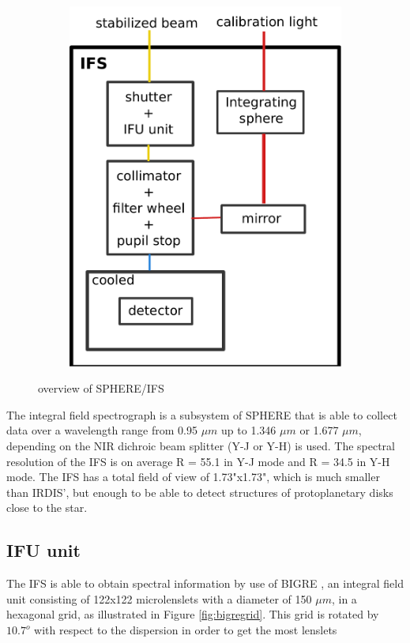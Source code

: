 \documentclass[twoside,single]{lion-msc}
\begin{document}
\begin{figure}[hb]
\begin{subfigure}{.30\textwidth}
  \includegraphics[trim={0cm 0cm 0cm 0cm},clip,width=1\linewidth]{overview}
  \caption{}
\end{subfigure}
\caption{overview of SPHERE/IFS}
\label{fig:overviewIFS}
\end{figure}

The integral field spectrograph is a subsystem of SPHERE that is able to collect data over a wavelength range from 0.95 $\mu m$ up to 1.346 $\mu m$ or 1.677 $\mu m$,  depending on the NIR dichroic beam splitter (Y-J or Y-H) is used. The spectral resolution of the IFS is on average R = 55.1 in Y-J mode and R = 34.5 in Y-H mode. The IFS has a total field of view of 1.73"x1.73", which is much smaller than IRDIS', but enough to be able to detect structures of protoplanetary disks close to the star.

\subsection{IFU unit}
The IFS is able to obtain spectral information by use of BIGRE \cite{Antichi2009}, an integral field unit consisting of 122x122 microlenslets with a diameter of 150 $\mu m$, in a hexagonal grid, as illustrated in Figure \ref{fig:bigregrid}. This grid is rotated by $10.7^o$ with respect to the dispersion in order to get the most lenslets
\end{document}
